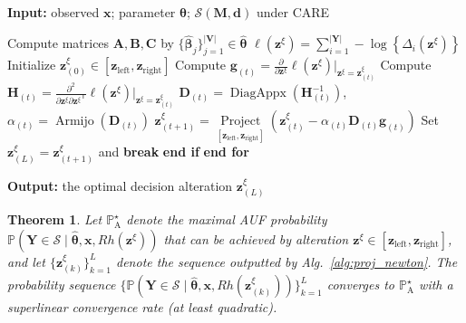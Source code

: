 \documentclass{article}
\theoremstyle{plain}
\newtheorem{theorem}{Theorem}[section]
\theoremstyle{definition}
\def \x {\mathbf{x}}
\def \H {\mathbf{H}}
\def \M {\mathbf{M}}
\def \A {\mathbf{A}}
\def \V {\mathbf{V}}
\def \Y{\mathbf{Y}}
\def \x {\mathbf{x}}
\def \V {\mathbf{V}}
\def \sS {\mathcal{S}}
\def \Y {\mathbf{Y}}
\def \g {\mathbf{g}}
\def \M {\mathbf{M}}
\def \H {\mathbf{H}}
\def \A {\mathbf{A}}
\def \V {\mathbf{V}}
\def \B {\mathbf{B}}
\def \C {\mathbf{C}}
\def \g {\mathbf{g}}
\def \H {\mathbf{H}}
\def \D {\mathbf{D}}
\def \z {\mathbf{z}}
\def \d {\mathbf{d}}
\begin{document}
\begin{algorithm}[h]
  \caption{Projection Newton for selecting optimal action}
  \label{alg:proj_newton}
  \hspace*{0.02in} \textbf{Input:} observed $\x$; parameter $\hat{\bm{\theta}}$; $\sS(\M, \d)$ under CARE
\begin{algorithmic}[1]
  \State Compute matrices $\A, \B, \C$ by $\{\hat{\bm{\beta}}_j\}_{j=1}^{|\V|}\in\hat{\bm{\theta}}$
  \vspace*{-0.03in}
  \State $\ell(\z^\xi)=\sum\limits_{i=1}^{|\Y|}-\log\left\{\Delta_i(\z^\xi)\right\}$ \Comment{$\Delta_i(\z^\xi)$ in Cor.~\ref{corol:convex}}
  \State Initialize $\z_{(0)}^\xi\in \left[\z_{\operatorname*{left}}, \z_{\operatorname*{right}}\right]$
  \vspace*{0.02in}
  \vspace*{0.02in}
    \State Compute $\g_{(t)} = \frac{\partial}{\partial \z^\xi} \ell(\z^\xi)\big\vert_{\z^\xi=\z_{(t)}^\xi}$
    \vspace*{-0.03in}
    \State Compute $\H_{(t)} = \frac{\partial^2}{\partial \z^\xi\partial {\z^\xi}^\mathsf{T}} \ell(\z^\xi)\big\vert_{\z^\xi=\z_{(t)}^\xi}$
    \vspace*{0.01in}
    \State {}
    \vspace*{0.03in}
    \State $\D_{(t)} = \operatorname*{DiagAppx}(\H_{(t)}^{-1})$, $\alpha_{(t)} = \operatorname*{Armijo}\left(\D_{(t)}\right)$ 
    \State $\z_{(t+1)}^\xi = \mathop{\operatorname*{Project}}\limits_{\left[\z_{\operatorname*{left}}, \z_{\operatorname*{right}}\right]}\left(\z_{(t)}^\xi-\alpha_{(t)} \D_{(t)} \g_{(t)}\right)$
    \If{$\|\z_{(t+1)}^\xi-\z_{(t)}^\xi\|<\delta$}
    \vspace*{0.02in}
    \State Set $\z^\xi_{(L)}=\z_{(t+1)}^\xi$ and \textbf{break}
    \EndIf
    \vspace*{-0.08in}
    \State \textbf{end if}
  \EndFor
  \State \textbf{end for}
\end{algorithmic}
\hspace*{0.02in} \textbf{Output:} the optimal decision alteration $\z^\xi_{(L)}$
\end{algorithm}


\begin{theorem}
  \vspace*{-0.1in}
\label{thm:converge}
    Let \(\mathbb{P}_{\operatorname*{A}}^\star\) denote the maximal AUF probability $\mathbb{P}(\Y \in \sS\mid \hat{\bm{\theta}}, \x, Rh(\z^\xi))$ that can be achieved by alteration $\z^\xi\in\left[\z_{\operatorname*{left}}, \z_{\operatorname*{right}}\right]$, 
    and let \(  \{\z^\xi_{(k)} \}_{k=1}^L\) denote the sequence outputted by Alg.~\ref{alg:proj_newton}. 
    The probability sequence \(\{\mathbb{P}(\Y \in \sS\mid \hat{\bm{\theta}}, \x, Rh(\z^\xi_{(k)}))\}_{k=1}^L\) converges to \(\mathbb{P}_{\operatorname*{A}}^\star\) with a superlinear convergence rate (at least quadratic).
\end{theorem}
\end{document}
